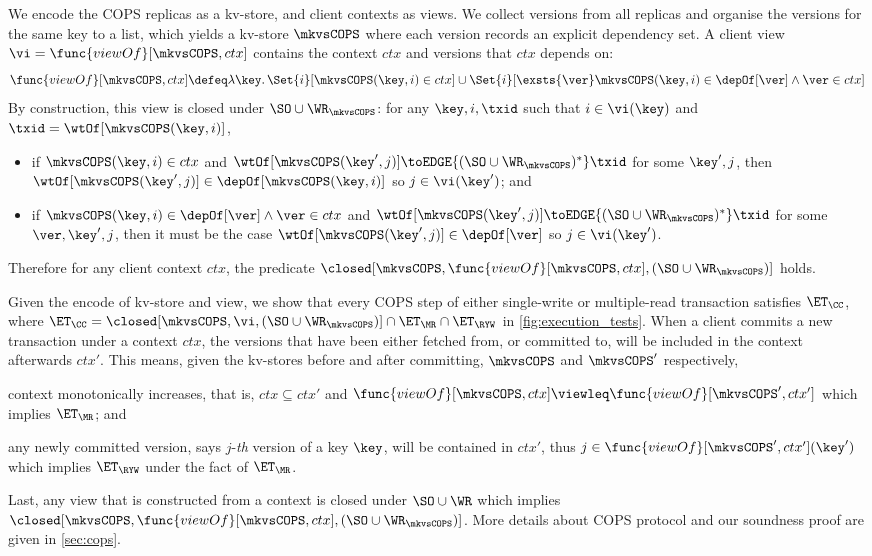 We encode the COPS replicas as a kv-store, and client contexts as views.  
We collect versions from all replicas and organise the versions for the same key to a list,
which yields a kv-store \( \mkvsCOPS \) where each version records an explicit dependency set.
A client view \( \vi = \func{viewOf}[\mkvsCOPS, ctx] \) contains the context \( ctx \) and versions that \( ctx \) depends on:
\[
    \func{viewOf}[\mkvsCOPS, ctx] \defeq \lambda \key \ldotp \Set{i}[\mkvsCOPS(\key,i) \in ctx] 
                            \cup \Set{i}[\exsts{\ver} \mkvsCOPS(\key,i) \in \depOf[\ver] \land \ver \in ctx]  
\]
By construction, this view is closed under \( \SO \cup \WR_{\mkvsCOPS} \):
for any \( \key, i, \txid\) such that \( i \in \vi(\key) \) and \( \txid = \wtOf[\mkvsCOPS(\key,i)]\),
\begin{itemize}
    \item if \( \mkvsCOPS(\key,i) \in ctx \) and \( \wtOf[\mkvsCOPS(\key',j)] \toEDGE{(\SO \cup \WR_{\mkvsCOPS})^*} \txid \) for some \( \key',j \),
        then \( \wtOf[\mkvsCOPS(\key',j)] \in \depOf[\mkvsCOPS(\key,i)] \) so \( j \in \vi(\key') \); and
    \item if \( \mkvsCOPS(\key,i) \in \depOf[\ver] \land \ver \in ctx \) and 
        \( \wtOf[\mkvsCOPS(\key',j)] \toEDGE{(\SO \cup \WR_{\mkvsCOPS})^*} \txid \) for some \( \ver,\key',j \),
        then it must be the case \( \wtOf[\mkvsCOPS(\key',j)]  \in \depOf[\ver] \) so \( j \in \vi(\key') \).
\end{itemize}
Therefore for any client context \( ctx \),
the predicate \( \closed[\mkvsCOPS,\func{viewOf}[\mkvsCOPS, ctx], \left( \SO \cup \WR_{\mkvsCOPS} \right)] \) holds.

Given the encode of kv-store and view, we show that every COPS step 
of either single-write or multiple-read transaction satisfies $\ET_\CC$,
where \(\ET_\CC = \closed[\mkvsCOPS, \vi, \left( \SO \cup \WR_{\mkvsCOPS} \right)] \cap \ET_\MR \cap \ET_\RYW \) 
in \cref{fig:execution_tests}.
When a client commits a new transaction under a context \( ctx \), 
the versions that have been either fetched from, or committed to, will be included in the context afterwards \( ctx' \).
This means, given the kv-stores before and after committing, \( \mkvsCOPS \) and \( \mkvsCOPS' \) respectively,
\begin{enumerate*} 
    \item context monotonically increases, that is, 
    \( ctx \subseteq ctx' \) and \( \func{viewOf}[\mkvsCOPS, ctx] \viewleq \func{viewOf}[\mkvsCOPS', ctx']\) which implies \(\ET_\MR\);
    and 
    \item any newly committed version, says \(j\)-\emph{th} version of a key \(\key\), will be contained in \( ctx' \),
    thus \( j \in \func{viewOf}[\mkvsCOPS', ctx'](\key') \) which implies \(\ET_\RYW \) under the fact of \(\ET_\MR\).
\end{enumerate*}
Last, any view that is constructed from a context is closed under \( \SO \cup \WR \) which implies \( \closed[\mkvsCOPS,\func{viewOf}[\mkvsCOPS, ctx], \left( \SO \cup \WR_{\mkvsCOPS} \right)] \).
More details about COPS protocol and our soundness proof are given in \cref{sec:cops}.

